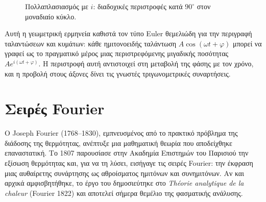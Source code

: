 \documentclass[a4paper, 11pt]{article}
\begin{document}
\begin{figure}[htbp]
\centering
{}
\caption{Πολλαπλασιασμός με $i$: διαδοχικές περιστροφές κατά $90^\circ$ στον μοναδιαίο κύκλο.}
\label{fig:i_rotation}
\end{figure}

Αυτή η γεωμετρική ερμηνεία καθιστά τον τύπο Euler θεμελιώδη για την
περιγραφή ταλαντώσεων και κυμάτων: κάθε ημιτονοειδής ταλάντωση
\(A\cos(\omega t + \varphi)\) μπορεί να γραφεί ως το πραγματικό μέρος
μιας περιστρεφόμενης μιγαδικής ποσότητας
\(A e^{i(\omega t + \varphi)}\). Η περιστροφή αυτή αντιστοιχεί στη
μεταβολή της φάσης με τον χρόνο, και η προβολή στους άξονες δίνει τις
γνωστές τριγωνομετρικές συναρτήσεις.

\section{Σειρές Fourier}\label{ux3c3ux3b5ux3b9ux3c1ux3adux3c2-fourier}

Ο Joseph Fourier (1768--1830), εμπνευσμένος από το πρακτικό πρόβλημα της
διάδοσης της θερμότητας, ανέπτυξε μια μαθηματική θεωρία που αποδείχθηκε
επαναστατική. Το 1807 παρουσίασε στην Ακαδημία Επιστημών του Παρισιού
την εξίσωση θερμότητας και, για να τη λύσει, εισήγαγε τις σειρές
Fourier: την έκφραση μιας αυθαίρετης συνάρτησης ως αθροίσματος ημιτόνων
και συνημιτόνων. Αν και αρχικά αμφισβητήθηκε, το έργο του δημοσιεύτηκε
στο \emph{Théorie analytique de la chaleur} (Fourier 1822) και αποτελεί
σήμερα θεμέλιο της φασματικής ανάλυσης.
\end{document}
